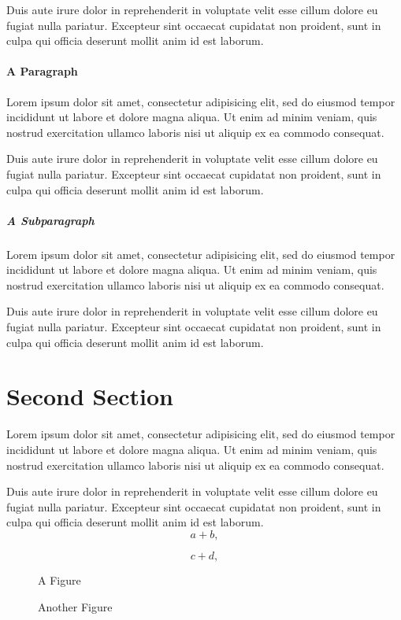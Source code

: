 \documentclass{book}
\begin{document}
Duis aute irure dolor in reprehenderit in voluptate velit esse cillum dolore eu fugiat nulla pariatur. Excepteur sint occaecat cupidatat non proident, sunt in culpa qui officia deserunt mollit anim id est laborum.

\paragraph{A Paragraph}
Lorem ipsum dolor sit amet, consectetur adipisicing elit, sed do eiusmod tempor incididunt ut labore et dolore magna aliqua. Ut enim ad minim veniam, quis nostrud exercitation ullamco laboris nisi ut aliquip ex ea commodo consequat.

Duis aute irure dolor in reprehenderit in voluptate velit esse cillum dolore eu fugiat nulla pariatur. Excepteur sint occaecat cupidatat non proident, sunt in culpa qui officia deserunt mollit anim id est laborum.

\subparagraph{A Subparagraph}
Lorem ipsum dolor sit amet, consectetur adipisicing elit, sed do eiusmod tempor incididunt ut labore et dolore magna aliqua. Ut enim ad minim veniam, quis nostrud exercitation ullamco laboris nisi ut aliquip ex ea commodo consequat.

Duis aute irure dolor in reprehenderit in voluptate velit esse cillum dolore eu fugiat nulla pariatur. Excepteur sint occaecat cupidatat non proident, sunt in culpa qui officia deserunt mollit anim id est laborum.

\section{Second Section}
Lorem ipsum dolor sit amet, consectetur adipisicing elit, sed do eiusmod tempor incididunt ut labore et dolore magna aliqua. Ut enim ad minim veniam, quis nostrud exercitation ullamco laboris nisi ut aliquip ex ea commodo consequat.

Duis aute irure dolor in reprehenderit in voluptate velit esse cillum dolore eu fugiat nulla pariatur. Excepteur sint occaecat cupidatat non proident, sunt in culpa qui officia deserunt mollit anim id est laborum.
\begin{equation}
 a + b,
\end{equation}

\begin{equation}
 c + d,
\end{equation}

\begin{figure}
\begin{centering}
A Figure\\
\end{centering}
\caption{Another Figure}
\end{figure}
\end{document}
